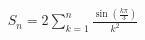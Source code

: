 \documentclass[preview]{standalone}
\begin{document}
\begin{align*}
S_n=2\sum_{k=1}^{n}\frac{\sin\!\left(\frac{k\pi}{3}\right)}{k^2}
\end{align*}
\end{document}
